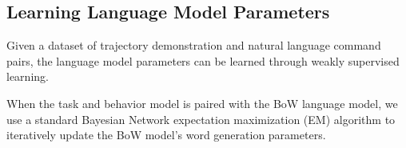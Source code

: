 \documentclass[conference]{IEEEtran}
\begin{document}
\subsection{Learning Language Model Parameters}
\label{sec:learnLang}
Given a dataset of trajectory demonstration and natural language command pairs, the language model parameters can be learned through weakly supervised learning. 

When the task and behavior model is paired with the BoW language model, we use a standard Bayesian Network expectation maximization (EM) algorithm \cite{dempster77} to iteratively update the BoW model's word generation parameters. 
\end{document}
